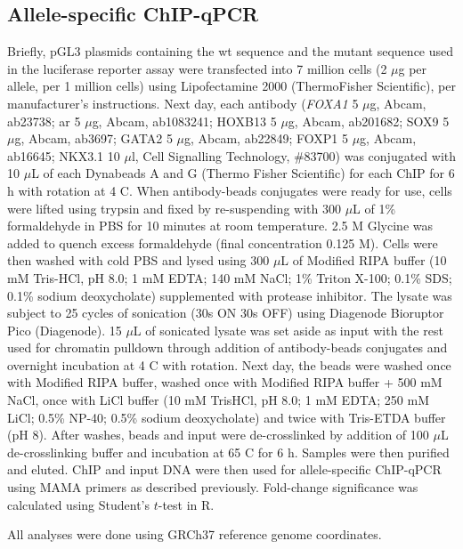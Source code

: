 \subsection{Allele-specific ChIP-qPCR}

Briefly, pGL3 plasmids containing the \gls{wt} sequence and the mutant sequence used in the luciferase reporter assay were transfected into 7 million cells (2 $\mu$g per allele, per 1 million cells) using Lipofectamine 2000 (ThermoFisher Scientific), per manufacturer's instructions.
Next day, each antibody (\emph{FOXA1} 5 $\mu$g, Abcam, ab23738; \gls{ar} 5 $\mu$g, Abcam, ab1083241; HOXB13 5 $\mu$g, Abcam, ab201682; SOX9 5 $\mu$g, Abcam, ab3697; GATA2 5 $\mu$g, Abcam, ab22849; FOXP1 5 $\mu$g, Abcam, ab16645; NKX3.1 10 $\mu$l, Cell Signalling Technology, \#83700) was conjugated with 10 $\mu$L of each Dynabeads A and G (Thermo Fisher Scientific) for each ChIP for 6 h with rotation at 4 \textdegree C.
When antibody-beads conjugates were ready for use, cells were lifted using trypsin and fixed by re-suspending with 300 $\mu$L of 1\% formaldehyde in PBS for 10 minutes at room temperature.
2.5 M Glycine was added to quench excess formaldehyde (final concentration 0.125 M).
Cells were then washed with cold PBS and lysed using 300 $\mu$L of Modified RIPA buffer (10 mM Tris-HCl, pH 8.0; 1 mM EDTA; 140 mM NaCl; 1\% Triton X-100; 0.1\% SDS; 0.1\% sodium deoxycholate) supplemented with protease inhibitor.
The lysate was subject to 25 cycles of sonication (30s ON 30s OFF) using Diagenode Bioruptor Pico (Diagenode).
15 $\mu$L of sonicated lysate was set aside as input with the rest used for chromatin pulldown through addition of antibody-beads conjugates and overnight incubation at 4 \textdegree C with rotation.
Next day, the beads were washed once with Modified RIPA buffer, washed once with Modified RIPA buffer + 500 mM NaCl, once with LiCl buffer (10 mM TrisHCl, pH 8.0; 1 mM EDTA; 250 mM LiCl; 0.5\% NP-40; 0.5\% sodium deoxycholate) and twice with Tris-ETDA buffer (pH 8).
After washes, beads and input were de-crosslinked by addition of 100 $\mu$L de-crosslinking buffer and incubation at 65 \textdegree C for 6 h.
Samples were then purified and eluted.
ChIP and input DNA were then used for allele-specific ChIP-qPCR using MAMA primers as described previously.
Fold-change significance was calculated using Student's $t$-test in R.

All analyses were done using GRCh37 \cite{internationalhumangenomesequencingconsortiumFinishingEuchromaticSequence2004} reference genome coordinates.
